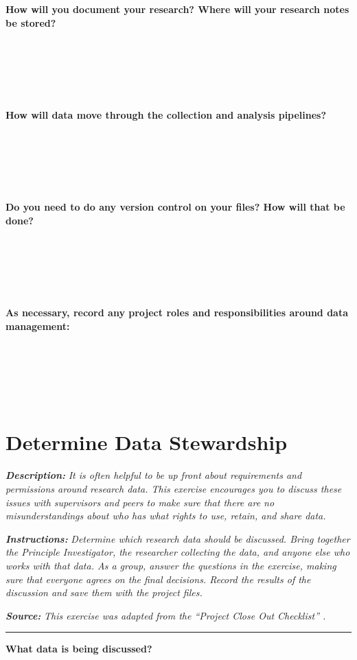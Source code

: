 \documentclass[
]{book}
\begin{document}
\textbf{How will you document your research? Where will your research notes be stored?}

~

~

~

\textbf{How will data move through the collection and analysis pipelines?}

~

~

~

\textbf{Do you need to do any version control on your files? How will that be done?}

~

~

~

\textbf{As necessary, record any project roles and responsibilities around data management:}

~

~

~

\hypertarget{data-governance}{%
\section{Determine Data Stewardship}\label{data-governance}}

\textbf{\emph{Description:}} \emph{It is often helpful to be up front about requirements and permissions around research data. This exercise encourages you to discuss these issues with supervisors and peers to make sure that there are no misunderstandings about who has what rights to use, retain, and share data.}

\textbf{\emph{Instructions:}} \emph{Determine which research data should be discussed. Bring together the Principle Investigator, the researcher collecting the data, and anyone else who works with that data. As a group, answer the questions in the exercise, making sure that everyone agrees on the final decisions. Record the results of the discussion and save them with the project files.}

\textbf{\emph{Source:}} \emph{This exercise was adapted from the ``Project Close Out Checklist'' \citep{briney_project_2020}.}

\begin{center}\rule{0.5\linewidth}{0.5pt}\end{center}

\textbf{What data is being discussed?}

~

~
\end{document}
